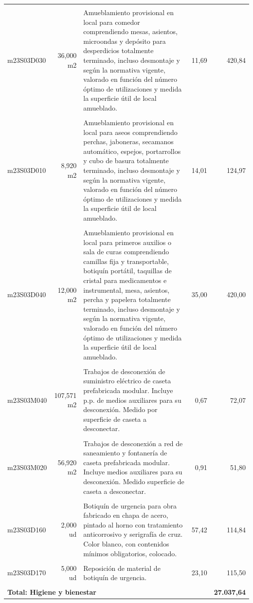 \documentclass{book}%
\begin{document}
\begin{longtable}{lrlrr}
&&&&\\%
m23S03D030&    36,000 m2&\multicolumn{1}{p{5cm}}{Amueblamiento provisional en local para comedor comprendiendo mesas, asientos, microondas y depósito para desperdicios totalmente terminado, incluso desmontaje y según la normativa vigente, valorado en función del número óptimo de utilizaciones y medida la superficie útil de local amueblado.}&     11,69&420,84\\%
&&&&\\%
m23S03D010&     8,920 m2&\multicolumn{1}{p{5cm}}{Amueblamiento provisional en local para aseos comprendiendo perchas, jaboneras, secamanos automático, espejos, portarrollos y cubo de basura totalmente terminado, incluso desmontaje y según la normativa vigente, valorado en función del número óptimo de utilizaciones y medida la superficie útil de local amueblado.}&     14,01&124,97\\%
&&&&\\%
m23S03D040&    12,000 m2&\multicolumn{1}{p{5cm}}{Amueblamiento provisional en local para primeros auxilios o sala de curas comprendiendo camillas fija y transportable, botiquín portátil, taquillas de cristal para medicamentos e instrumental, mesa, asientos, percha y papelera totalmente terminado, incluso desmontaje y según la normativa vigente, valorado en función del número óptimo de utilizaciones y medida la superficie útil de local amueblado.}&     35,00&420,00\\%
&&&&\\%
m23S03M040&   107,571 m2&\multicolumn{1}{p{5cm}}{Trabajos de desconexión de suministro eléctrico de caseta prefabricada modular. Incluye p.p. de medios auxiliares para su desconexión. Medido por superficie de caseta a desconectar.}&      0,67&72,07\\%
&&&&\\%
m23S03M020&    56,920 m2&\multicolumn{1}{p{5cm}}{Trabajos de desconexión a red de saneamiento y fontanería de caseta prefabricada modular. Incluye medios auxiliares para su desconexión. Medido superficie de caseta a desconectar.}&      0,91&51,80\\%
&&&&\\%
m23S03D160&     2,000 ud&\multicolumn{1}{p{5cm}}{Botiquín de urgencia para obra fabricado en chapa de acero, pintado al horno con tratamiento anticorrosivo y serigrafía de cruz. Color blanco, con contenidos mínimos obligatorios, colocado.}&     57,42&114,84\\%
&&&&\\%
m23S03D170&     5,000 ud&\multicolumn{1}{p{5cm}}{Reposición de material de botiquín de urgencia.}&     23,10&115,50\\%
&&&&\\%
\multicolumn{4}{p{8cm}}{\textbf{Total: Higiene y bienestar}}&\textbf{27.037,64}\\%
\end{longtable}%
\normalsize
\end{document}
